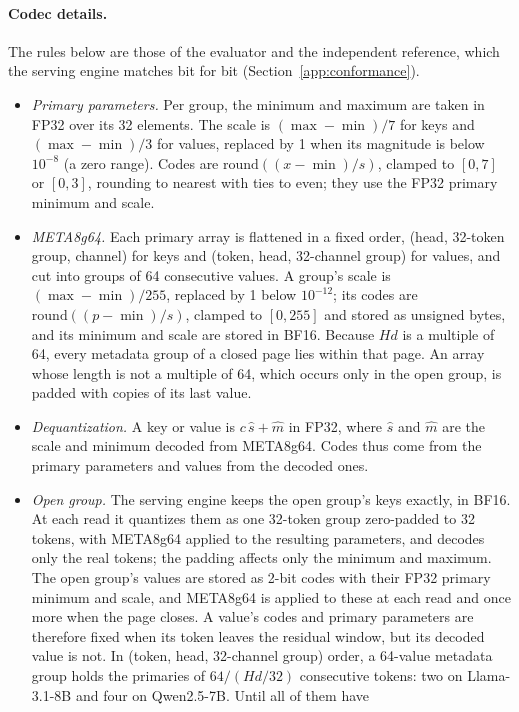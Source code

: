 \documentclass{article}
\begin{document}
\paragraph{Codec details.}
The rules below are those of the evaluator and the independent reference, which the serving engine
matches bit for bit (Section~\ref{app:conformance}).
\begin{itemize}
\item \emph{Primary parameters.} Per group, the minimum and maximum are taken in FP32 over its 32
  elements. The scale is $(\max-\min)/7$ for keys and $(\max-\min)/3$ for values, replaced by 1 when its
  magnitude is below $10^{-8}$ (a zero range). Codes are $\mathrm{round}((x-\min)/s)$, clamped to
  $[0,7]$ or $[0,3]$, rounding to nearest with ties to even; they use the FP32 primary minimum and scale.
\item \emph{META8g64.} Each primary array is flattened in a fixed order, (head, 32-token group,
  channel) for keys and (token, head, 32-channel group) for values, and cut into groups of 64
  consecutive values. A group's scale is $(\max-\min)/255$, replaced by 1 below $10^{-12}$; its codes
  are $\mathrm{round}((p-\min)/s)$, clamped to $[0,255]$ and stored as unsigned bytes, and its minimum
  and scale are stored in BF16. Because $Hd$ is a multiple of 64, every metadata group of a closed page
  lies within that page. An array whose length is not a multiple of 64, which occurs only in the open
  group, is padded with copies of its last value.
\item \emph{Dequantization.} A key or value is $c\,\hat{s} + \hat{m}$ in FP32, where $\hat{s}$ and
  $\hat{m}$ are the scale and minimum decoded from META8g64. Codes thus come from the primary parameters
  and values from the decoded ones.
\item \emph{Open group.} The serving engine keeps the open group's keys exactly, in BF16. At each read
  it quantizes them as one 32-token group zero-padded to 32 tokens, with META8g64 applied to the
  resulting parameters, and decodes only the real tokens; the padding affects only the minimum and
  maximum. The open group's values are stored as 2-bit codes with their FP32 primary minimum and scale,
  and META8g64 is applied to these at each read and once more when the page closes. A value's codes and
  primary parameters are therefore fixed when its token leaves the residual window, but its decoded
  value is not. In (token, head, 32-channel group) order, a 64-value metadata group holds the primaries
  of $64/(Hd/32)$ consecutive tokens: two on Llama-3.1-8B and four on Qwen2.5-7B. Until all of them have

\end{itemize}
\end{document}
